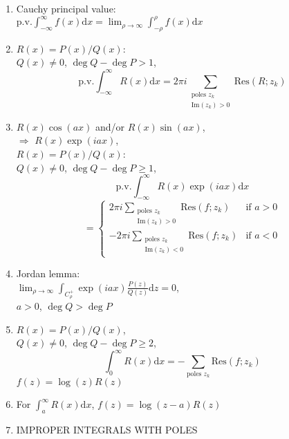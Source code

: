 \documentclass[11pt,a4paper]{article}
\begin{document}
\begin{multicols}{2}
\begin{enumerate}[resume]
\item Cauchy principal value: \\$\mathrm{p.v.}\int_{-\infty}^{\infty} f(x) \mathrm{d}x = \lim_{\rho \to \infty} \int_{-\rho}^{\rho} f(x) \mathrm{d}x$

\item $R(x) = P(x)/Q(x)$: \\$Q(x) \neq 0$, $\deg Q - \deg P >1$, 
$$\mathrm{p.v.}\int_{-\infty}^{\infty} R(x) \mathrm{d}x = 2 \pi i \sum_{\substack{\text{poles } z_k \\ \mathrm{Im}(z_k) >0}} \mathrm{Res}(R;z_k)$$

\item $R(x) \cos (ax)$ and/or $R(x) \sin (ax)$, \\$\Rightarrow$ $R(x) \exp (iax)$, \\$R(x) = P(x)/Q(x)$: \\$Q(x) \neq 0$, $\deg Q - \deg P \geq 1$, \[
\mathrm{p.v.}\int_{-\infty}^{\infty} R(x) \exp (iax) \mathrm{d}x
\]
\[
= 
\begin{cases}
2 \pi i \sum_{\substack{\text{poles }z_k \\ \mathrm{Im}(z_k)>0}} \mathrm{Res}(f;z_k) &\text{if } a>0 \\
-2 \pi i \sum_{\substack{\text{poles }z_k \\ \mathrm{Im}(z_k)<0}} \mathrm{Res}(f;z_k) &\text{if } a<0
\end{cases}
\]

\item Jordan lemma: \\$\lim_{\rho \to \infty} \int_{C_{\rho}^{+}} \exp (iax) \frac{P(z)}{Q(z)} \mathrm{d}z =0$, \\$a>0$, $\deg Q > \deg P$

\item $R(x) = P(x) / Q(x)$, \\$Q(x) \neq 0$, $\deg Q - \deg P \geq 2$, $$\int_0^{\infty} R(x) \mathrm{d}x = - \sum_{\text{poles }z_k} \mathrm{Res}(f;z_k)$$
$f(z) = \log (z) R(z)$

\item For $\int_a^{\infty} R(x) \mathrm{d}x$, $f(z) = \log(z-a) R(z)$

\item IMPROPER INTEGRALS WITH POLES
\end{enumerate}

\end{multicols}
\end{document}
